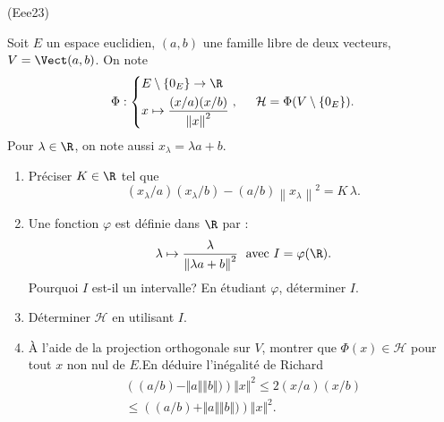 \begin{tiny}(Eee23)\end{tiny} Soit $E$ un espace euclidien, $(a,b)$ une famille libre de deux vecteurs, $V=\Vect(a,b)$. On note
\begin{displaymath}
\Phi:
\left\lbrace 
\begin{aligned}
&E\setminus\left\lbrace 0_E\right\rbrace  \rightarrow \R \\
&x \mapsto \frac{(x/a)(x/b)}{\left\|x\right\|^2}
\end{aligned}
\right. 
,\hspace{0.5cm}
  \mathcal{H} = \Phi(V \setminus\left\lbrace 0_E\right\rbrace) .
\end{displaymath}
Pour $\lambda \in \R$, on note aussi $x_\lambda = \lambda a  +b$.
\begin{enumerate}
  \item Préciser $K\in \R$ tel que
\[
 (x_\lambda /a)(x_\lambda /b) -(a/b)\left\|x_\lambda \right\|^2 = K \,\lambda .
\]

  \item Une fonction $\varphi$ est définie dans $\R$ par :
  \begin{displaymath}
    \lambda \mapsto \frac{\lambda}{\left\|\lambda a + b\right\|^2}\; \text{ avec } I = \varphi(\R).
  \end{displaymath}
Pourquoi $I$ est-il un intervalle? En étudiant $\varphi$, déterminer $I$.

  \item Déterminer $\mathcal{H}$ en utilisant $I$.
  
  \item \`A l'aide de la projection orthogonale sur $V$, montrer que $\Phi(x) \in \mathcal{H}$ pour tout $x$ non nul de $E$.\newline En déduire l'inégalité de Richard
\begin{multline*}
  \left( (a/b)-\Vert a\Vert \Vert b\Vert)\right) \Vert x \Vert^2
\leq 2(x/a)(x/b)  \\ \leq
  \left( (a/b)+\Vert a\Vert \Vert b\Vert)\right) \Vert x \Vert^2 .
\end{multline*}

\end{enumerate}

